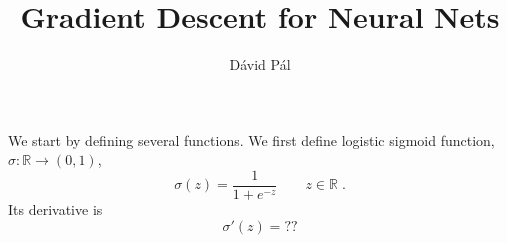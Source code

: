 \documentclass{article}
\title{Gradient Descent for Neural Nets}
\author{D\'avid P\'al}
\newcommand{\R}{\mathbb{R}}
\begin{document}
We start by defining several functions.
We first define logistic sigmoid function, $\sigma:\R \to (0,1)$,
$$
\sigma(z) = \frac{1}{1 + e^{-z}} \qquad z \in \R \; .
$$
Its derivative is
$$
\sigma'(z) = ??
$$
\end{document}
